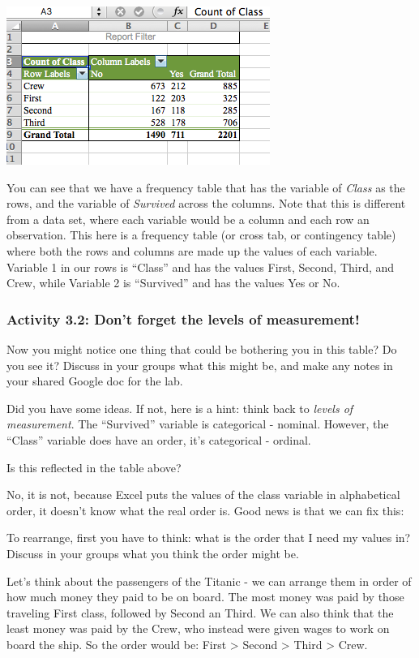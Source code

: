 \documentclass[
]{book}
\begin{document}
\includegraphics{imgs/crosstabl_pivot.png}

You can see that we have a frequency table that has the variable of \emph{Class} as the rows, and the variable of \emph{Survived} across the columns. Note that this is different from a data set, where each variable would be a column and each row an observation. This here is a frequency table (or cross tab, or contingency table) where both the rows and columns are made up the values of each variable. Variable 1 in our rows is ``Class'' and has the values First, Second, Third, and Crew, while Variable 2 is ``Survived'' and has the values Yes or No.~

\hypertarget{activity-3.2-dont-forget-the-levels-of-measurement}{%
\subsubsection{Activity 3.2: Don't forget the levels of measurement!}\label{activity-3.2-dont-forget-the-levels-of-measurement}}

Now you might notice one thing that could be bothering you in this table? Do you see it? Discuss in your groups what this might be, and make any notes in your shared Google doc for the lab.

Did you have some ideas. If not, here is a hint: think back to \emph{levels of measurement}. The ``Survived'' variable is categorical - nominal. However, the ``Class'' variable does have an order, it's categorical - ordinal.

Is this reflected in the table above?

No, it is not, because Excel puts the values of the class variable in alphabetical order, it doesn't know what the real order is. Good news is that we can fix this:

To rearrange, first you have to think: what is the order that I need my values in? Discuss in your groups what you think the order might be.

Let's think about the passengers of the Titanic - we can arrange them in order of how much money they paid to be on board. The most money was paid by those traveling First class, followed by Second an Third. We can also think that the least money was paid by the Crew, who instead were given wages to work on board the ship. So the order would be: First \textgreater{} Second \textgreater{} Third \textgreater{} Crew.
\end{document}
